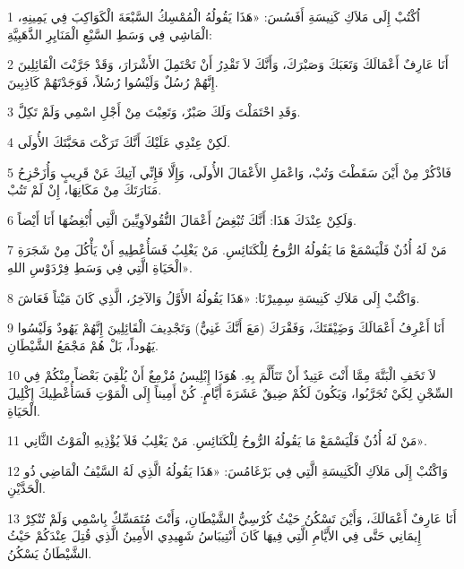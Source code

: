 \par 1 اُكْتُبْ إِلَى مَلاَكِ كَنِيسَةِ أَفَسُسَ: «هَذَا يَقُولُهُ الْمُمْسِكُ السَّبْعَةَ الْكَوَاكِبَ فِي يَمِينِهِ، الْمَاشِي فِي وَسَطِ السَّبْعِ الْمَنَايِرِ الذَّهَبِيَّةِ:
\par 2 أَنَا عَارِفٌ أَعْمَالَكَ وَتَعَبَكَ وَصَبْرَكَ، وَأَنَّكَ لاَ تَقْدِرُ أَنْ تَحْتَمِلَ الأَشْرَارَ، وَقَدْ جَرَّبْتَ الْقَائِلِينَ إِنَّهُمْ رُسُلٌ وَلَيْسُوا رُسُلاً، فَوَجَدْتَهُمْ كَاذِبِينَ.
\par 3 وَقَدِ احْتَمَلْتَ وَلَكَ صَبْرٌ، وَتَعِبْتَ مِنْ أَجْلِ اسْمِي وَلَمْ تَكِلَّ.
\par 4 لَكِنْ عِنْدِي عَلَيْكَ أَنَّكَ تَرَكْتَ مَحَبَّتَكَ الأُولَى.
\par 5 فَاذْكُرْ مِنْ أَيْنَ سَقَطْتَ وَتُبْ، وَاعْمَلِ الأَعْمَالَ الأُولَى، وَإِلَّا فَإِنِّي آتِيكَ عَنْ قَرِيبٍ وَأُزَحْزِحُ مَنَارَتَكَ مِنْ مَكَانِهَا، إِنْ لَمْ تَتُبْ.
\par 6 وَلَكِنْ عِنْدَكَ هَذَا: أَنَّكَ تُبْغِضُ أَعْمَالَ النُّقُولاَوِيِّينَ الَّتِي أُبْغِضُهَا أَنَا أَيْضاً.
\par 7 مَنْ لَهُ أُذُنٌ فَلْيَسْمَعْ مَا يَقُولُهُ الرُّوحُ لِلْكَنَائِسِ. مَنْ يَغْلِبُ فَسَأُعْطِيهِ أَنْ يَأْكُلَ مِنْ شَجَرَةِ الْحَيَاةِ الَّتِي فِي وَسَطِ فِرْدَوْسِ اللهِ».
\par 8 وَاكْتُبْ إِلَى مَلاَكِ كَنِيسَةِ سِمِيرْنَا: «هَذَا يَقُولُهُ الأَوَّلُ وَالآخِرُ، الَّذِي كَانَ مَيْتاً فَعَاشَ.
\par 9 أَنَا أَعْرِفُ أَعْمَالَكَ وَضَِيْقَتَكَ، وَفَقْرَكَ (مَعَ أَنَّكَ غَنِيٌّ) وَتَجْدِيفَ الْقَائِلِينَ إِنَّهُمْ يَهُودٌ وَلَيْسُوا يَهُوداً، بَلْ هُمْ مَجْمَعُ الشَّيْطَانِ.
\par 10 لاَ تَخَفِ الْبَتَّةَ مِمَّا أَنْتَ عَتِيدٌ أَنْ تَتَأَلَّمَ بِهِ. هُوَذَا إِبْلِيسُ مُزْمِعٌ أَنْ يُلْقِيَ بَعْضاً مِنْكُمْ فِي السِّجْنِ لِكَيْ تُجَرَّبُوا، وَيَكُونَ لَكُمْ ضِيقٌ عَشَرَةَ أَيَّامٍ. كُنْ أَمِيناً إِلَى الْمَوْتِ فَسَأُعْطِيكَ إِكْلِيلَ الْحَيَاةِ.
\par 11 مَنْ لَهُ أُذُنٌ فَلْيَسْمَعْ مَا يَقُولُهُ الرُّوحُ لِلْكَنَائِسِ. مَنْ يَغْلِبُ فَلاَ يُؤْذِيهِ الْمَوْتُ الثَّانِي».
\par 12 وَاكْتُبْ إِلَى مَلاَكِ الْكَنِيسَةِ الَّتِي فِي بَرْغَامُسَ: «هَذَا يَقُولُهُ الَّذِي لَهُ السَّيْفُ الْمَاضِي ذُو الْحَدَّيْنِ.
\par 13 أَنَا عَارِفٌ أَعْمَالَكَ، وَأَيْنَ تَسْكُنُ حَيْثُ كُرْسِيُّ الشَّيْطَانِ، وَأَنْتَ مُتَمَسِّكٌ بِاسْمِي وَلَمْ تُنْكِرْ إِيمَانِي حَتَّى فِي الأَيَّامِ الَّتِي فِيهَا كَانَ أَنْتِيبَاسُ شَهِيدِي الأَمِينُ الَّذِي قُتِلَ عِنْدَكُمْ حَيْثُ الشَّيْطَانُ يَسْكُنُ.
